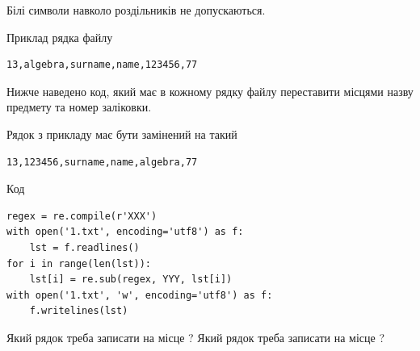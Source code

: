 \documentclass[12pt, ukrainian]{article}
\begin{document}
{Білі символи навколо роздільників не допускаються.

Приклад рядка файлу



\begin{verbatim}
13,algebra,surname,name,123456,77
\end{verbatim}


Нижче наведено код, який має в кожному рядку файлу переставити місцями назву предмету та номер заліковки.

Рядок з прикладу має бути замінений на такий



\begin{verbatim}
13,123456,surname,name,algebra,77
\end{verbatim}




Код



\begin{verbatim}
regex = re.compile(r'XXX')
with open('1.txt', encoding='utf8') as f:
    lst = f.readlines()
for i in range(len(lst)):
    lst[i] = re.sub(regex, YYY, lst[i])
with open('1.txt', 'w', encoding='utf8') as f:
    f.writelines(lst)
\end{verbatim}





Який рядок треба записати на місце  ?
Який рядок треба записати на місце  ?\par

}
\newpage
\end{document}
